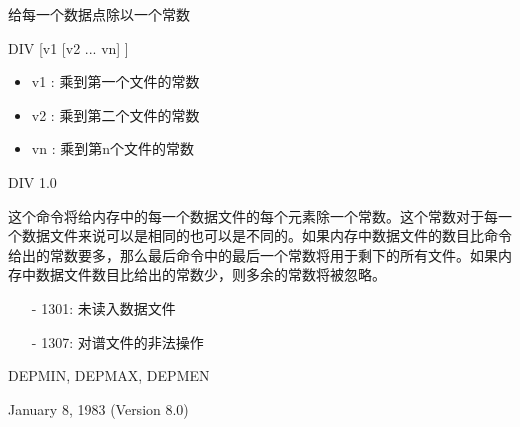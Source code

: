 \label{cmd:div}

给每一个数据点除以一个常数

DIV [v1 [v2 ... vn] ]

\begin{itemize}
\item v1 : 乘到第一个文件的常数
\item v2 : 乘到第二个文件的常数
\item vn : 乘到第n个文件的常数 
\end{itemize}

DIV 1.0

这个命令将给内存中的每一个数据文件的每个元素除一个常数。这个常数对于每一个数据文件来说可以是相同的也可以是不同的。如果内存中数据文件的数目比命令给出的常数要多，那么最后命令中的最后一个常数将用于剩下的所有文件。如果内存中数据文件数目比给出的常数少，则多余的常数将被忽略。

\begin{itemize}
\item[-]1301: 未读入数据文件
\item[-]1307: 对谱文件的非法操作
\end{itemize}

DEPMIN, DEPMAX, DEPMEN

January 8, 1983 (Version 8.0)
